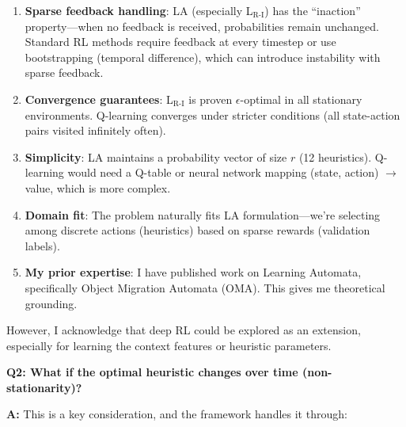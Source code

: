 \documentclass[11pt]{article}
\begin{document}
\begin{enumerate}
    \item \textbf{Sparse feedback handling}: LA (especially L$_{\text{R-I}}$) has the ``inaction'' property---when no feedback is received, probabilities remain unchanged. Standard RL methods require feedback at every timestep or use bootstrapping (temporal difference), which can introduce instability with sparse feedback.

    \item \textbf{Convergence guarantees}: L$_{\text{R-I}}$ is proven $\epsilon$-optimal in all stationary environments. Q-learning converges under stricter conditions (all state-action pairs visited infinitely often).

    \item \textbf{Simplicity}: LA maintains a probability vector of size $r$ (12 heuristics). Q-learning would need a Q-table or neural network mapping (state, action) $\to$ value, which is more complex.

    \item \textbf{Domain fit}: The problem naturally fits LA formulation---we're selecting among discrete actions (heuristics) based on sparse rewards (validation labels).

    \item \textbf{My prior expertise}: I have published work on Learning Automata, specifically Object Migration Automata (OMA). This gives me theoretical grounding.
\end{enumerate}

However, I acknowledge that deep RL could be explored as an extension, especially for learning the context features or heuristic parameters.

\textbf{Q2: What if the optimal heuristic changes over time (non-stationarity)?}

\textbf{A:} This is a key consideration, and the framework handles it through:
\end{document}
